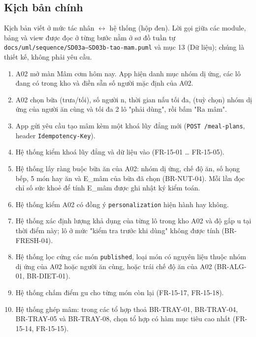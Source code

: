 \subsection{Kịch bản chính}
Kịch bản viết ở mức tác nhân \ensuremath{\leftrightarrow} hệ thống (hộp đen). Lời gọi giữa các module, bảng và view được đọc ở từng bước nằm ở sơ đồ tuần tự {\small\texttt{docs/\allowbreak{}\allowbreak{}uml/\allowbreak{}\allowbreak{}sequence/\allowbreak{}\allowbreak{}SD03a–SD03b-\allowbreak{}tao-\allowbreak{}mam.\allowbreak{}puml}} và mục 13 (Dữ liệu); chúng là thiết kế, không phải yêu cầu.

\begin{enumerate}
\item A02 mở màn Mâm cơm hôm nay. App hiện danh mục nhóm dị ứng, các lô đang có trong kho và điền sẵn số người mặc định của A02.
\item A02 chọn bữa (trưa/\allowbreak{}tối), số người n, thời gian nấu tối đa, (tuỳ chọn) nhóm dị ứng của người ăn cùng và tối đa 2 lô "phải dùng", rồi bấm "Ra mâm".
\item App gửi yêu cầu tạo mâm kèm một khoá lũy đẳng mới ({\small\texttt{POST /\allowbreak{}\allowbreak{}meal-\allowbreak{}plans}}, header {\small\texttt{Idempotency-\allowbreak{}Key}}).
\item Hệ thống kiểm khoá lũy đẳng và dữ liệu vào (FR-\allowbreak{}15-\allowbreak{}01 \ldots{} FR-\allowbreak{}15-\allowbreak{}05).
\item Hệ thống lấy ràng buộc bữa ăn của A02: nhóm dị ứng, chế độ ăn, số họng bếp, 5 món hay ăn và E\_\allowbreak{}mâm của bữa đã chọn (BR-\allowbreak{}NUT-\allowbreak{}04). Mỗi lần đọc chỉ số sức khoẻ để tính E\_\allowbreak{}mâm được ghi nhật ký kiểm toán.
\item Hệ thống kiểm A02 có đồng ý {\small\texttt{personalization}} hiện hành hay không.
\item Hệ thống xác định lượng khả dụng của từng lô trong kho A02 và độ gấp u tại thời điểm này; lô ở mức "kiểm tra trước khi dùng" không được tính (BR-\allowbreak{}FRESH-\allowbreak{}04).
\item Hệ thống lọc cứng các món {\small\texttt{published}}, loại món có nguyên liệu thuộc nhóm dị ứng của A02 hoặc người ăn cùng, hoặc trái chế độ ăn của A02 (BR-\allowbreak{}ALG-\allowbreak{}01, BR-\allowbreak{}DIET-\allowbreak{}01).
\item Hệ thống chấm điểm gu cho từng món còn lại (FR-\allowbreak{}15-\allowbreak{}17, FR-\allowbreak{}15-\allowbreak{}18).
\item Hệ thống ghép mâm: trong các tổ hợp thoả BR-\allowbreak{}TRAY-\allowbreak{}01, BR-\allowbreak{}TRAY-\allowbreak{}04, BR-\allowbreak{}TRAY-\allowbreak{}05 và BR-\allowbreak{}TRAY-\allowbreak{}08, chọn tổ hợp có hàm mục tiêu cao nhất (FR-\allowbreak{}15-\allowbreak{}14, FR-\allowbreak{}15-\allowbreak{}15).

\end{enumerate}
